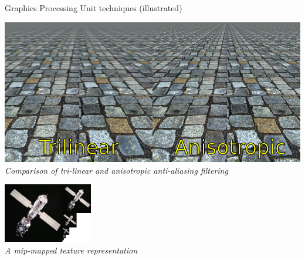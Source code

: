 \begin{frame}{Graphics Processing Unit techniques (illustrated)}
  \begin{minipage}{0.45\textwidth}
    \centering
    \includegraphics[width=\textwidth]{slides/graphics-hardware/anisotropic-filtering.png}\\
    \textit{Comparison of tri-linear and anisotropic anti-aliasing filtering}
  \end{minipage}
  \hfill
  \begin{minipage}{0.45\textwidth}
    \centering
    \includegraphics[height=7em]{slides/graphics-hardware/mip-map.jpg}\\
    \textit{A mip-mapped texture representation}
  \end{minipage}
\end{frame}

